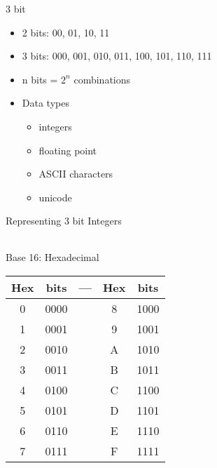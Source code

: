 \begin{withoutheadline}
\begin{frame}{3 bit}
\begin{itemize}
    \item 2 bits: 00, 01, 10, 11
    \item 3 bits: 000, 001, 010, 011, 100, 101, 110, 111
    \item n bits = $2^n$ combinations
    \item Data types
    \begin{itemize}
        \item integers
        \item floating point
        \item ASCII characters
        \item unicode
    \end{itemize}
\end{itemize}
\end{frame}

\begin{frame}[fragile]{Representing 3 bit Integers}
\begin{tabular}{p{2.5cm}|p{2.5cm}|p{2.5cm}}    %
\end{tabular}
\end{frame}

\begin{frame}[fragile]{Base 16: Hexadecimal}
\begin{tabular}{c|c|c|c|c} \toprule
    Hex & bits & --- & Hex & bits  \\ \midrule 
    0 & 0000 & & 8 & 1000 \\
    1 & 0001 & & 9 & 1001 \\
    2 & 0010 & & A & 1010 \\
    3 & 0011 & & B & 1011 \\
    4 & 0100 & & C & 1100 \\
    5 & 0101 & & D & 1101 \\
    6 & 0110 & & E & 1110 \\
    7 & 0111 & & F & 1111 \\    \bottomrule
\end{tabular}
\end{frame}


\end{withoutheadline}
